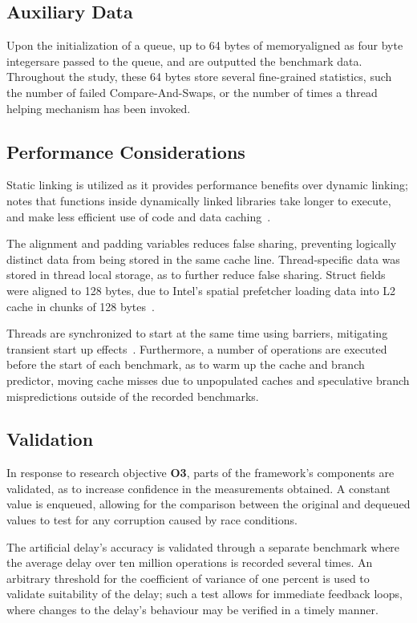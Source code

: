 \subsection{Auxiliary Data}
Upon the initialization of a queue, up to 64 bytes of memory\textemdash aligned as four
byte integers\textemdash are passed to the queue, and are outputted
the benchmark data. Throughout the study, these 64
bytes store several fine-grained statistics, such the number of failed Compare-And-Swaps,
or the number of times a thread helping mechanism has been invoked.

\subsection{Performance Considerations}
Static linking is utilized as it provides performance benefits over dynamic
linking; \citeauthor{fog2020optimizing} notes that functions inside dynamically
linked libraries take longer to execute, and make less efficient use of code
and data caching~\citep[Section~14.11]{fog2020optimizing}.

The alignment and padding variables reduces false sharing, preventing logically
distinct data from being stored in the same cache line.
Thread-specific data was stored in thread local storage, as to further reduce
false sharing. Struct fields were aligned to 128 bytes, due to
Intel's spatial prefetcher loading data into L2
cache in chunks of 128 bytes~\citep[Section~E.2.5.4]{intelmanualoptimization}.

Threads are synchronized to start at the same time using
barriers, mitigating transient start up effects~\citep{hoffman2007baskets}.
Furthermore, a number of operations are executed before the start of each
benchmark, as to warm up the cache and branch predictor, moving cache misses
due to unpopulated caches and speculative branch mispredictions outside of the
recorded benchmarks.

\subsection{Validation}
In response to research objective \textbf{O3}, parts of the framework's
components are validated, as to increase confidence in the measurements
obtained. A constant value is enqueued, allowing for the comparison
between the original and dequeued values to test for any corruption caused by race conditions. 

The artificial delay's accuracy is validated through a separate
benchmark where the average delay over ten million operations is recorded several times.
An arbitrary threshold for the coefficient of variance of one percent is used
to validate suitability of the delay; such a test allows for immediate feedback
loops, where changes to the delay's behaviour may be verified in a timely
manner.

